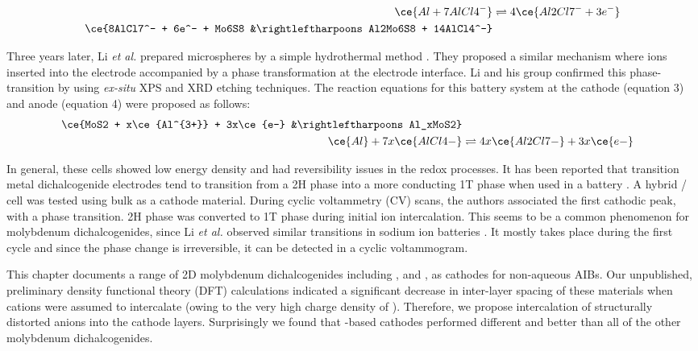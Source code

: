 \begin{align}
          \ce{Al + 7AlCl4^-} &\rightleftharpoons 4\ce{Al2Cl7^- + 3e^-}\\
\ce{8AlCl7^- + 6e^- + Mo6S8 &\rightleftharpoons Al2Mo6S8 + 14AlCl4^-}
\end{align}

Three years later, Li \textit{et al.} prepared  microspheres by a simple hydrothermal method \cite{li_rechargeable_2018-2}. They proposed a similar mechanism where  ions inserted into the electrode accompanied by a phase transformation at the electrode interface. Li and his group confirmed this phase-transition by using \textit{ex-situ} XPS and XRD etching techniques. The reaction equations for this battery system at the cathode (equation 3) and anode (equation 4) were proposed as follows:
\begin{align}
    \ce{MoS2 + x\ce{Al^{3+}}  + 3x\ce{e-} &\rightleftharpoons Al_xMoS2}\\
    \ce{Al} + 7x\ce{AlCl4-} &\rightleftharpoons 4x\ce{Al2Cl7-} + 3x\ce{e-}
\end{align}

In general, these cells showed low energy density and had reversibility issues in the redox processes. It has been reported that transition metal dichalcogenide electrodes tend to transition from a 2H phase into a more conducting 1T phase when used in a battery \cite{fan_hybrid_2017}. A hybrid / cell was tested using bulk  as a cathode material. During cyclic voltammetry (CV) scans, the authors associated the first cathodic peak, with a phase transition. 2H phase  was converted to 1T phase during initial ion intercalation. This seems to be a common phenomenon for molybdenum dichalcogenides, since Li \textit{et al.} observed similar transitions in sodium ion batteries \cite{li_enhancing_2015}. It mostly takes place during the first cycle and since the phase change is irreversible, it can be detected in a cyclic voltammogram.

This chapter documents a range of 2D molybdenum dichalcogenides including ,  and , as cathodes for non-aqueous AIBs. Our unpublished, preliminary density functional theory (DFT) calculations indicated a significant decrease in inter-layer spacing of these materials when  cations were assumed to intercalate (owing to the very high charge density of ). Therefore, we propose intercalation of structurally distorted  anions into the cathode layers. Surprisingly we found that -based cathodes performed different and better than all of the other molybdenum dichalcogenides.

